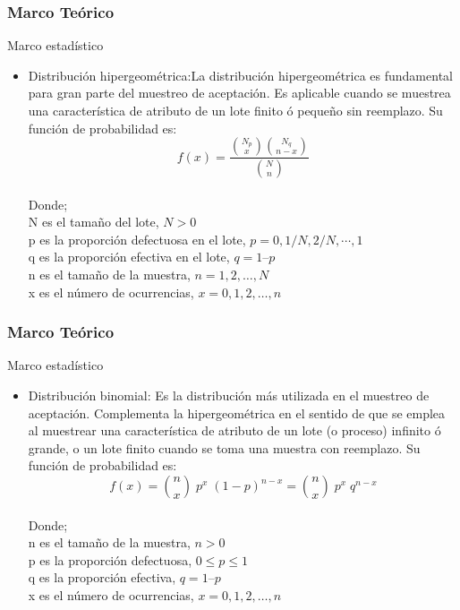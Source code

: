 \documentclass[10pt]{beamer}
\begin{document}
\begin{frame}
\frametitle{Marco Teórico}
\begin{block}{Marco estadístico}
\begin{itemize}
\justifying
\item Distribución hipergeométrica:La distribución hipergeométrica es fundamental para gran parte del muestreo de aceptación. Es aplicable cuando se muestrea una característica de atributo de un lote finito ó pequeño sin reemplazo. Su función de probabilidad es:
$$f(x)=\frac{\binom{N_p}{x}\binom{N_q}{n-x}}{\binom{N}{n}}$$
~\\ Donde; 
~\\ N es el tamaño del lote, $N>0$
~\\ p es la proporción defectuosa en el lote, $p=0, 1/N, 2/N, \cdots , 1$
~\\ q es la proporción efectiva en el lote, $q = 1 – p$
~\\ n es el tamaño de la muestra, $n = 1, 2, …, N$
~\\ x es el número de ocurrencias, $x = 0, 1, 2, …, n$
\end{itemize}
\end{block}
\end{frame}

\begin{frame}
\frametitle{Marco Teórico}
\begin{block}{Marco estadístico}
\begin{itemize}
\justifying
\item Distribución binomial: Es la distribución más utilizada en el muestreo de aceptación. Complementa la hipergeométrica en el sentido de que se emplea al muestrear una característica de atributo de un lote (o proceso) infinito ó grande, o un lote finito cuando se toma una muestra con reemplazo. Su función de probabilidad es:
$$f(x)=\binom{n}{x} \; p^x \; (1-p)^{n-x}=\binom{n}{x} \; p^x \; q^{n-x}$$
~\\ Donde; 
~\\ n es el tamaño de la muestra, $n>0$
~\\ p es la proporción defectuosa, $0\leq p \leq 1$
~\\ q es la proporción efectiva, $q = 1 – p$
~\\ x es el número de ocurrencias, $x = 0, 1, 2, …, n$
\end{itemize}
\end{block}
\end{frame}
\end{document}
